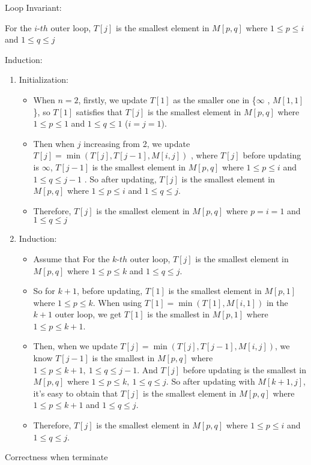 
\item
  Loop Invariant:

  For the \(i\)-\(th\) outer loop, \(T[j]\) is the smallest element in
  \(M[p,q]\) where \(1\le p \le i\) and \(1\le q \le j\)
\item
  Induction:

\begin{enumerate}
  \def\labelenumii{\arabic{enumii}.}
  \item
    Initialization:

    \begin{itemize}
    \item
      When \(n=2\), firstly, we update \(T[1]\) as the smaller one in
      \{\(\infty\) , \(M[1,1]\) \}, so \(T[1]\) satisfies that \(T[j ]\)
      is the smallest element in \(M[p,q]\) where \(1\le p \le 1\) and
      \(1\le q \le 1\) (\(i=j=1 \)).
    \item
      Then when \(j\) increasing from 2, we update
      \(T[j] = \min(T[j], T[j-1], M[i,j])\) , where \(T[j]\) before
      updating is \(\infty\), \(T[j-1]\) is the smallest element in
      \(M[p,q]\) where \(1\le p \le i\) and \(1\le q \le j-1\) . So
      after updating, \(T[j]\) is the smallest element in \(M[p,q]\)
      where \(1\le p \le i\) and \(1\le q \le j\).
    \item
      Therefore, \(T[j]\) is the smallest element in \(M[p,q]\) where
      \(p= i= 1\) and \(1\le q \le j\)
    \end{itemize}
  \item
    Induction:

    \begin{itemize}
    \item
      Assume that For the \(k\)-\(th\) outer loop, \(T[j]\) is the
      smallest element in \(M[p,q]\) where \(1\le p \le k\) and
      \(1\le q \le j\).
    \item
      So for \(k+1\), before updating, \(T[1]\) is the smallest element
      in \(M[p,1]\) where \(1\le p\le k\). When using
      \(T[1]=\min (T[1],M[i,1])\) in the \(k+1\) outer loop, we get
      \(T[1]\) is the smallest in \(M[p,1]\) where \(1\le p \le k+1\).
    \item
      Then, when we update \(T[j] = \min(T[j], T[j-1], M[i,j])\), we
      know \(T[j-1]\) is the smallest in \(M[p,q]\) where
      \(1\le p \le k+1,\ 1\le q \le j-1\). And \(T[j]\) before updating
      is the smallest in \(M[p,q]\) where
      \(1\le p \le k,\ 1\le q \le j\). So after updating with
      \(M[k+1, j]\), it's easy to obtain that \(T[j]\) is the smallest
      element in \(M[p,q]\) where \(1\le p \le k+1\) and
      \(1\le q \le j\).
    \item
      Therefore, \(T[j]\) is the smallest element in \(M[p,q]\) where
      \(1\le p \le i\) and \(1\le q \le j\).
    \end{itemize}
  \end{enumerate}
\item
  Correctness when terminate

